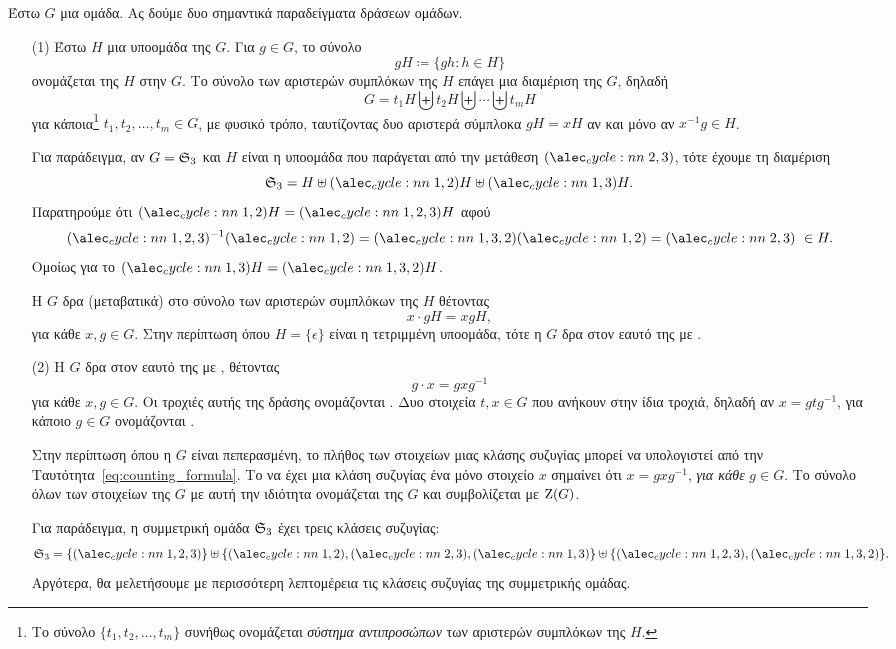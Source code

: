 \documentclass[12pt,a4paper,reqno]{amsart}
\newcommand{\defn}[1]{{\color{mylightblue}{#1}}}
\begin{document}
\begin{example}
    \label{ex:group_actions}
    Έστω $G$ μια ομάδα. Ας δούμε δυο σημαντικά παραδείγματα δράσεων ομάδων.
    \begin{itemize}
        \item[(1)] Έστω $H$ μια υποομάδα της $G$. Για $g \in G$, το σύνολο
        \[
        gH \coloneqq \{gh : h \in H\}
        \]
        ονομάζεται \defn{αριστερό σύμπλοκο} της $H$ στην $G$. 
        Το σύνολο των αριστερών συμπλόκων της $H$ επάγει μια διαμέριση της $G$, δηλαδή 
        \[
        G = t_1H \biguplus t_2H \biguplus \cdots \biguplus t_mH
        \]
        για κάποια\footnote{Το σύνολο $\{t_1, t_2, \dots, t_m\}$ συνήθως ονομάζεται \emph{σύστημα αντιπροσώπων} των αριστερών συμπλόκων της $H$.} $t_1, t_2, \dots, t_m \in G$, με φυσικό τρόπο, ταυτίζοντας δυο αριστερά σύμπλοκα $gH = xH$ αν και μόνο αν $x^{-1}g \in H$.

        Για παράδειγμα, αν $G = \mathfrak{S}_3$ και $H$ είναι η υποομάδα που παράγεται από την μετάθεση $\cycle{2,3}$, τότε έχουμε τη διαμέριση 
        \[
        \fS_3 = H \uplus \cycle{1,2}H \uplus \cycle{1,3}H.
        \]
        Παρατηρούμε ότι $\cycle{1,2}H = \cycle{1,2,3}H$ αφού 
        \[
        \cycle{1,2,3}^{-1}\cycle{1,2} = \cycle{1,3,2}\cycle{1,2} = \cycle{2,3} \ \in H.
        \]
        Ομοίως για το $\cycle{1,3}H = \cycle{1,3,2}H$.

        H $G$ δρα (μεταβατικά) στο σύνολο των αριστερών συμπλόκων της $H$ θέτοντας
        \[
        x \cdot gH = xgH,
        \]
        για κάθε $x ,g \in G$. Στην περίπτωση όπου $H = \{\epsilon\}$ είναι η τετριμμένη υποομάδα, τότε η $G$ δρα στον εαυτό της με \defn{αριστερό πολλαπλασιασμό}.

        \item[(2)] Η $G$ δρα στον εαυτό της με \defn{συζυγία}, θέτοντας
        \[
        g \cdot x = gxg^{-1}
        \]
        για κάθε $x, g \in G$. Οι τροχιές αυτής της δράσης ονομάζονται \defn{κλάσεις συζυγίας}. Δυο στοιχεία $t, x \in G$ που ανήκουν στην ίδια τροχιά, δηλαδή αν $x = gtg^{-1}$, για κάποιο $g \in G$ ονομάζονται \defn{συζυγή}. 

        Στην περίπτωση όπου η $G$ είναι πεπερασμένη, το πλήθος των στοιχείων μιας κλάσης συζυγίας μπορεί να υπολογιστεί από την Ταυτότητα~\eqref{eq:counting_formula}. Το να έχει μια κλάση συζυγίας ένα μόνο στοιχείο $x$ σημαίνει ότι $x = gxg^{-1}$, \emph{για κάθε} $g \in G$. Το σύνολο όλων των στοιχείων της $G$ με αυτή την ιδιότητα ονομάζεται \defn{κέντρο} της $G$ και συμβολίζεται με $\mathrm{Z}(G)$.

        Για παράδειγμα, η συμμετρική ομάδα $\mathfrak{S}_3$ έχει τρεις κλάσεις συζυγίας: 
        \[
        \fS_3 = \{\cycle{1,2,3}\} \uplus \{\cycle{1,2}, \cycle{2,3}, \cycle{1,3}\} \uplus \{\cycle{1,2,3}, \cycle{1,3,2}\}.
        \]
        Αργότερα, θα μελετήσουμε με περισσότερη λεπτομέρεια τις κλάσεις συζυγίας της συμμετρικής ομάδας.
    \end{itemize}
\end{example}
\end{document}
